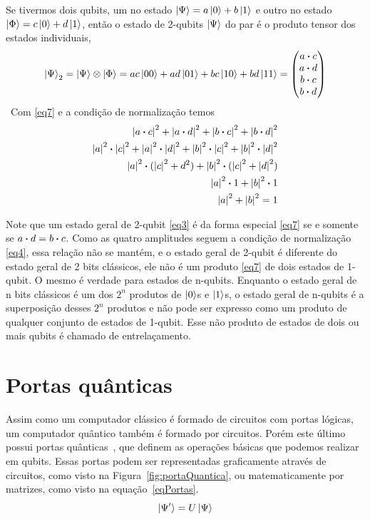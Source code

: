\documentclass[a4paper, 12pt, oneside]{book}
\begin{document}
Se tivermos dois qubits, um no estado $\ket{\Psi} = a\ket{0} + b\ket{1}$ e outro no estado $\ket{\Phi} = c\ket{0} + d\ket{1}$, então o estado de 2-qubits $\ket{\Psi}$ do par é o produto tensor dos estados individuais,
\begin{equation}\label{eq7}
\ket{\Psi}_2 = \ket{\Psi}\otimes\ket{\Phi} 
= ac\ket{00} + ad\ket{01} + bc\ket{10} + bd\ket{11}
= \mqty(a \vdot c\\a \vdot d\\b \vdot c\\b \vdot d)
\end{equation}\
Com \eqref{eq7} e a condição de normalização temos
\begin{align*}
\abs{a \vdot c}^2 + \abs{a \vdot d}^2 + \abs{b \vdot c}^2 + \abs{b \vdot d}^2 \\
\abs{a}^2 \vdot \abs{c}^2 + \abs{a}^2 \vdot \abs{d}^2 + \abs{b}^2 \vdot \abs{c}^2 + \abs{b}^2 \vdot \abs{d}^2 \\
\abs{a}^2 \vdot (\abs{c}^2 + {d}^2) + \abs{b}^2 \vdot (\abs{c}^2 + \abs{d}^2) \\
\abs{a}^2 \vdot 1 + \abs{b}^2 \vdot 1 \\
\abs{a}^2 + \abs{b}^2 = 1
\end{align*}

Note que um estado geral de 2-qubit \eqref{eq3} é da forma especial \eqref{eq7} se e somente se $a\vdot d=b\vdot c$. Como as quatro amplitudes seguem a condição de normalização \eqref{eq4}, essa relação não se mantém, e o estado geral de 2-qubit é diferente do estado geral de 2 bits clássicos, ele não é um produto \eqref{eq7} de dois estados de 1-qubit. O mesmo é verdade para estados de n-qubits. Enquanto o estado geral de n bits clássicos é um dos $2^n$ produtos de $\ket{0}$s e $\ket{1}$s, o estado geral de n-qubits é a superposição desses $2^n$ produtos e não pode ser expresso como um produto de qualquer conjunto de estados de 1-qubit. Esse não produto de estados de dois ou mais qubits é chamado de entrelaçamento.

\section{Portas quânticas}
Assim como um computador clássico é formado de circuitos com portas lógicas, um computador quântico também é formado por circuitos. Porém este último possui portas quânticas~\cite{nielsen}, que definem as operações básicas que podemos realizar em qubits. Essas portas podem ser representadas graficamente através de circuitos, como visto na Figura~\ref{fig:portaQuantica}, ou matematicamente por matrizes, como visto na equação~\eqref{eqPortas}.
\begin{equation}\label{eqPortas}
\ket{\Psi'} =  U\ket{\Psi}
\end{equation}
\end{document}
